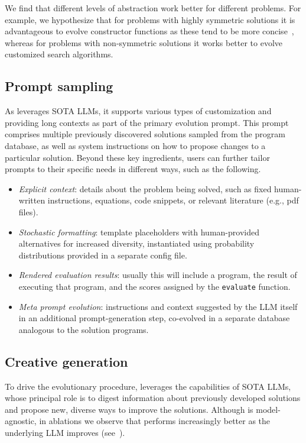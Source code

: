 We find that different levels of abstraction work better for different problems.
For example, we hypothesize that for problems with highly symmetric solutions it is advantageous to evolve constructor functions as these tend to be more concise~\cite{paredes2023mathematical}, whereas for problems with non-symmetric solutions it works better to evolve customized search algorithms.


\subsection{Prompt sampling}
\label{subsec:prompting}

As \method leverages SOTA LLMs, it supports various types of customization and providing long contexts as part of the primary evolution prompt.
This prompt comprises multiple previously discovered solutions sampled from the program database, as well as system instructions on how to propose changes to a particular solution.
Beyond these key ingredients, users can further tailor prompts to their specific needs in different ways, such as the following.
\begin{itemize}
\item
\emph{Explicit context}: details about the problem being solved, such as fixed human-written instructions, equations, code snippets, or relevant literature (e.g., pdf files).
\item
\emph{Stochastic formatting}: template placeholders with human-provided alternatives for increased diversity, instantiated using probability distributions provided in a separate config file.
\item
\emph{Rendered evaluation results}: usually this will include a program, the result of executing that program, and the scores assigned by the \texttt{evaluate} function.
\item
\emph{Meta prompt evolution}: instructions and context suggested by the LLM itself in an additional prompt-generation step, co-evolved in a separate database analogous to the solution programs.
\end{itemize}


\subsection{Creative generation}
\label{subsec:generation}

To drive the evolutionary procedure, \method leverages the capabilities of SOTA LLMs, whose principal role is to digest information about previously developed solutions and propose new, diverse ways to improve the solutions.
Although \method is model-agnostic, in ablations we observe that \method performs increasingly better as the underlying LLM improves (see~).


